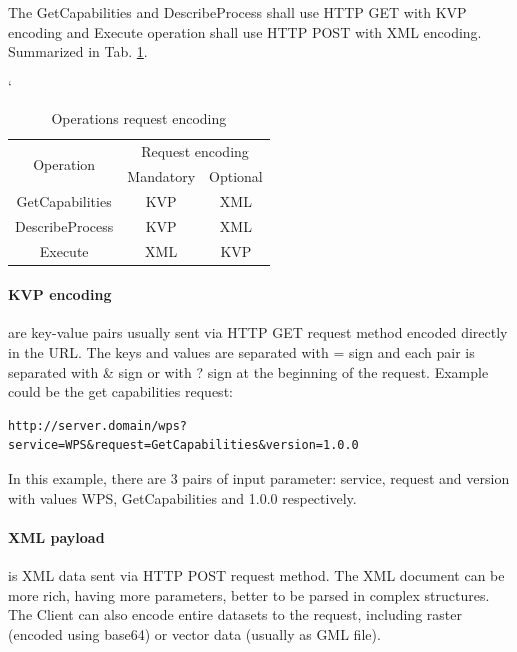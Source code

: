 The GetCapabilities and DescribeProcess shall use HTTP GET with KVP encoding and Execute operation shall use HTTP
POST with XML encoding. Summarized in Tab. \ref{tab:WPS_encoding}.
\begin{table}[h!]
\catcode`
\centering
\begin{tabular}{|c|c|c|}
\hline
\multirow{2}{*}{Operation} & \multicolumn{2}{c|}{Request encoding} \\ \cline{2-3} 
                           & Mandatory          & Optional         \\ \hhline{|=|=|=|}
GetCapabilities            & KVP                & XML              \\ \hline
DescribeProcess            & KVP                & XML              \\ \hline
Execute                    & XML                & KVP              \\ \hline
\end{tabular}
\caption{Operations request encoding}
\label{tab:WPS_encoding}
\end{table}


\paragraph{KVP encoding} are key-value pairs usually sent via HTTP GET request method encoded directly in the URL. The 
keys and values are separated with = sign and each pair is separated with \& sign  or with ? sign at the beginning of 
the request. Example could be the get capabilities request:

\begin{lstlisting}[basicstyle=\small,caption={GetCapabilities with KVP encoding.}]
http://server.domain/wps?service=WPS&request=GetCapabilities&version=1.0.0
\end{lstlisting}

In this example, there are 3 pairs of input parameter: service, request and version with values WPS, GetCapabilities and 
1.0.0 respectively.\cite{PyWPS_docs}

\paragraph{XML payload} is XML data sent via HTTP POST request method. The XML document can be more rich, having more 
parameters, better to be parsed in complex structures. The Client can also encode entire datasets to the request, 
including raster (encoded using base64) or vector data (usually as GML file).\cite{PyWPS_docs}

